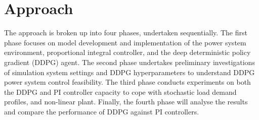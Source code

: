 \chapter{Approach}
The approach is broken up into four phases, undertaken sequentially. The first phase focuses on model development and implementation of the power system environment, proportional integral controller, and the deep deterministic policy gradient (DDPG) agent. The second phase undertakes preliminary investigations of simulation system settings and DDPG hyperparameters to understand DDPG power system control feasibility. The third phase conducts experiments on both the DDPG and PI controller capacity to cope with stochastic load demand profiles, and non-linear plant. Finally, the fourth phase will analyse the results and compare the performance of DDPG against PI controllers.









